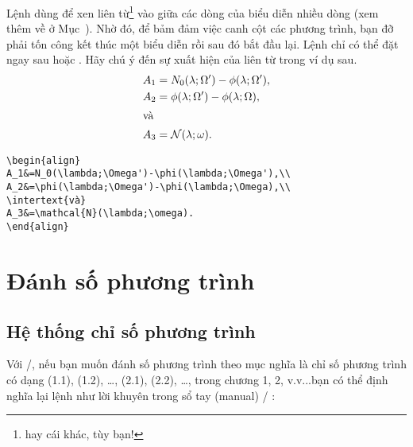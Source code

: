 \documentclass[11pt,leqno,titlepage,openany,oneside]{amsldoc}[1999/12/13]
\begin{document}
Lệnh  dùng để xen liên từ\footnote{hay cái khác, tùy bạn!}
vào giữa các dòng của biểu diễn nhiều dòng (xem thêm về 
ở Mục~). Nhờ đó, để bảm đảm việc canh cột các phương trình,
bạn đỡ phải tốn công kết thúc một biểu diễn rồi sau đó bắt đầu lại.
Lệnh  chỉ có thể đặt ngay sau \cn{\\} hoặc \cn{\\*}.
Hãy chú ý đến sự xuất hiện của liên từ  trong ví dụ sau.
\begin{align}
A_1&=N_0(\lambda;\Omega')-\phi(\lambda;\Omega'),\\
A_2&=\phi(\lambda;\Omega')-\phi(\lambda;\Omega),\\
\intertext{và}
A_3&=\mathcal{N}(\lambda;\omega).
\end{align}
\begin{verbatim}
\begin{align}
A_1&=N_0(\lambda;\Omega')-\phi(\lambda;\Omega'),\\
A_2&=\phi(\lambda;\Omega')-\phi(\lambda;\Omega),\\
\intertext{và}
A_3&=\mathcal{N}(\lambda;\omega).
\end{align}
\end{verbatim}

\section{Đánh số phương trình}

\subsection{Hệ thống chỉ số phương trình}
Với \latex/, nếu bạn muốn đánh số phương trình theo mục\mdash
nghĩa là chỉ số phương trình có dạng (1.1), (1.2), \dots, (2.1), (2.2), \dots,
trong chương 1, 2, v.v...\mdash bạn có thể định nghĩa lại lệnh
 như lời khuyên trong sổ tay (manual) \latex/ 
\cite[\S6.3, \S C.8.4]{lamport}:
\end{document}
